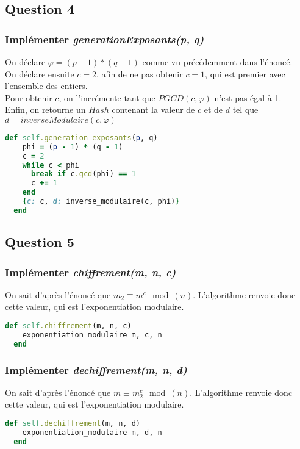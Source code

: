 \documentclass[a4paper,10pt]{article}
\begin{document}
\subsection{Question 4}
\subsubsection{Implémenter \textit{generationExposants(p, q)}}
On déclare $\varphi = (p-1)*(q-1)$ comme vu précédemment dans l'énoncé.\\
On déclare ensuite $c = 2$, afin de ne pas obtenir $c=1$, qui est premier avec l'ensemble des entiers.\\
Pour obtenir $c$, on l'incrémente tant que $PGCD(c, \varphi)$ n'est pas égal à 1.\\
Enfin, on retourne un $Hash$ contenant la valeur de $c$ et de $d$ tel que $d = inverseModulaire(c, \varphi)$
\begin{lstlisting}[language=Ruby]
  def self.generation_exposants(p, q)
    phi = (p - 1) * (q - 1)
    c = 2
    while c < phi
      break if c.gcd(phi) == 1
      c += 1
    end
    {c: c, d: inverse_modulaire(c, phi)}
  end
\end{lstlisting}

\clearpage
\subsection{Question 5}
\subsubsection{Implémenter \textit{chiffrement(m, n, c)}}
On sait d'après l'énoncé que $m_2 \equiv m^c \mod(n)$. L'algorithme renvoie donc cette valeur, qui est l'exponentiation modulaire.\\
\begin{lstlisting}[language=Ruby]
  def self.chiffrement(m, n, c)
    exponentiation_modulaire m, c, n
  end
\end{lstlisting}

\subsubsection{Implémenter \textit{dechiffrement(m, n, d)}}
On sait d'après l'énoncé que $m \equiv m_2^c \mod(n)$. L'algorithme renvoie donc cette valeur, qui est l'exponentiation modulaire.\\
\begin{lstlisting}[language=Ruby]
  def self.dechiffrement(m, n, d)
    exponentiation_modulaire m, d, n
  end
\end{lstlisting}
\end{document}

